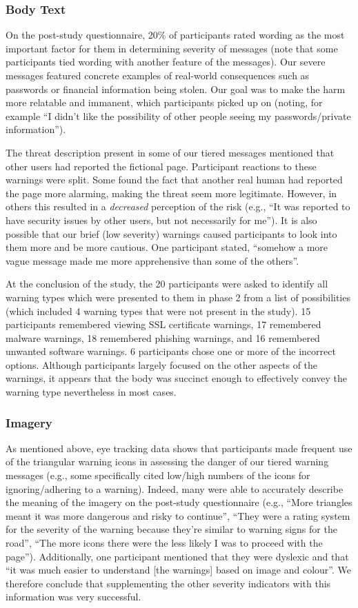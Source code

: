 \subsubsection{Body Text}
On the post-study questionnaire, 20\% of participants rated wording as the most important factor for them in determining severity of messages (note that some participants tied wording with another feature of the messages). Our severe messages featured concrete examples of real-world consequences such as passwords or financial information being stolen. Our goal was to make the harm more relatable and immanent, which participants picked up on (noting, for example ``I didn't like the possibility of other people seeing my passwords/private information'').

The threat description present in some of our tiered messages mentioned that other users had reported the fictional page. Participant reactions to these warnings were split. Some found the fact that another real human had reported the page more alarming, making the threat seem more legitimate. However, in others this resulted in a \emph{decreased} perception of the risk (e.g., ``It was reported to have security issues by other users, but not necessarily for me''). It is also possible that our brief (low severity) warnings caused participants to look into them more and be more cautious. One participant stated, ``somehow a more vague message made me more apprehensive than some of the others''.

At the conclusion of the study, the 20 participants were asked to identify all warning types which were presented to them in phase 2 from a list of possibilities (which included 4 warning types that were not present in the study). 15 participants remembered viewing SSL certificate warnings, 17 remembered malware warnings, 18 remembered phishing warnings, and 16 remembered unwanted software warnings. 6 participants chose one or more of the incorrect options. Although participants largely focused on the other aspects of the warnings, it appears that the body was succinct enough to effectively convey the warning type nevertheless in most cases.

\subsubsection{Imagery}
As mentioned above, eye tracking data shows that participants made frequent use of the triangular warning icons in assessing the danger of our tiered warning messages (e.g., some specifically cited low/high numbers of the icons for ignoring/adhering to a warning). Indeed, many were able to accurately describe the meaning of the imagery on the post-study questionnaire (e.g., ``More triangles meant it was more dangerous and risky to continue'', ``They were a rating system for the severity of the warning because they're similar to warning signs for the road'', ``The more icons there were the less likely I was to proceed with the page''). Additionally, one participant mentioned that they were dyslexic and that ``it was much easier to understand [the warnings] based on image and colour''. We therefore conclude that supplementing the other severity indicators with this information was very successful.

